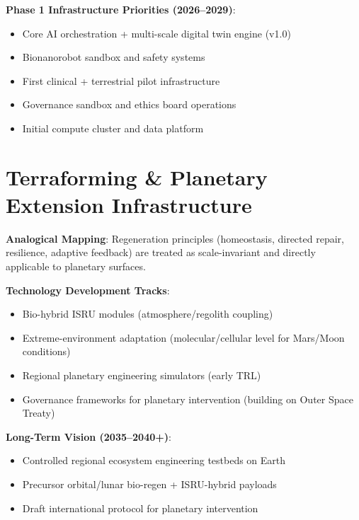 \documentclass[11pt,a4paper]{report}
\begin{document}
\textbf{Phase 1 Infrastructure Priorities (2026--2029)}:
\begin{itemize}
    \item Core AI orchestration + multi-scale digital twin engine (v1.0)
    \item Bionanorobot sandbox and safety systems
    \item First clinical + terrestrial pilot infrastructure
    \item Governance sandbox and ethics board operations
    \item Initial compute cluster and data platform
\end{itemize}

\chapter{Terraforming \& Planetary Extension Infrastructure}

\textbf{Analogical Mapping}:
Regeneration principles (homeostasis, directed repair, resilience, adaptive feedback) are treated as scale-invariant and directly applicable to planetary surfaces.

\textbf{Technology Development Tracks}:
\begin{itemize}
    \item Bio-hybrid ISRU modules (atmosphere/regolith coupling)
    \item Extreme-environment adaptation (molecular/cellular level for Mars/Moon conditions)
    \item Regional planetary engineering simulators (early TRL)
    \item Governance frameworks for planetary intervention (building on Outer Space Treaty)
\end{itemize}

\textbf{Long-Term Vision (2035--2040+)}:
\begin{itemize}
    \item Controlled regional ecosystem engineering testbeds on Earth
    \item Precursor orbital/lunar bio-regen + ISRU-hybrid payloads
    \item Draft international protocol for planetary intervention
\end{itemize}

\end{document}
